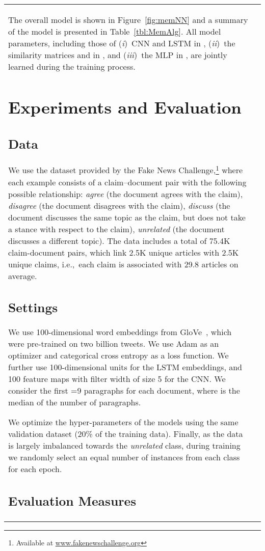 \documentclass[11pt,a4paper]{article}
\newcommand{\Ni}{({\em i})~}
\newcommand{\Nii}{({\em ii})~}
\newcommand{\Niii}{({\em iii})~}
\begin{document}
\begin{table}
{\begin{tabularx}{1.15\linewidth}{|lX|}
The overall model is shown in Figure~\ref{fig:memNN} and a summary of the model is presented in Table~\ref{tbl:MemAlg}. All model parameters, including those of \Ni CNN and LSTM in , \Nii the similarity matrices  and  in , and \Niii the MLP in , are jointly learned during the training process.
 
 \section{Experiments and Evaluation}
\label{sec:experiments}

\subsection{Data}

We use the dataset provided by the Fake News Challenge,\footnote{Available at \url{www.fakenewschallenge.org}} where each example consists of a claim--document pair with the following possible relationship:
\emph{agree} (the document agrees with the claim),
\emph{disagree} (the document disagrees with the claim),
\emph{discuss} (the document discusses the same topic as the claim, but does not take a stance with respect to the claim),
\emph{unrelated} (the document discusses a different topic). 
The data includes a total of 75.4K claim-document pairs, which link 2.5K unique articles with 2.5K unique claims, i.e.,~each claim is associated with 29.8 articles on average. 

\subsection{Settings}
We use 100-dimensional word embeddings from GloVe~\cite{Pennington14glove:global}, which were pre-trained on two billion tweets. We use Adam
as an optimizer and categorical cross entropy as a loss function. 
We further use 100-dimensional units for the LSTM embeddings, and 100 feature maps with filter width of size 5 for the CNN. We consider the first =9 paragraphs for each document, where  is the median of the number of paragraphs.

We optimize the hyper-parameters of the models using the same validation dataset (20\% of the training data).
Finally, as the data is largely imbalanced towards the \emph{unrelated} class, during training we randomly select an equal number of instances from each class for each epoch. 

\subsection{Evaluation Measures}


\end{tabularx}}
\end{table}
\end{document}
